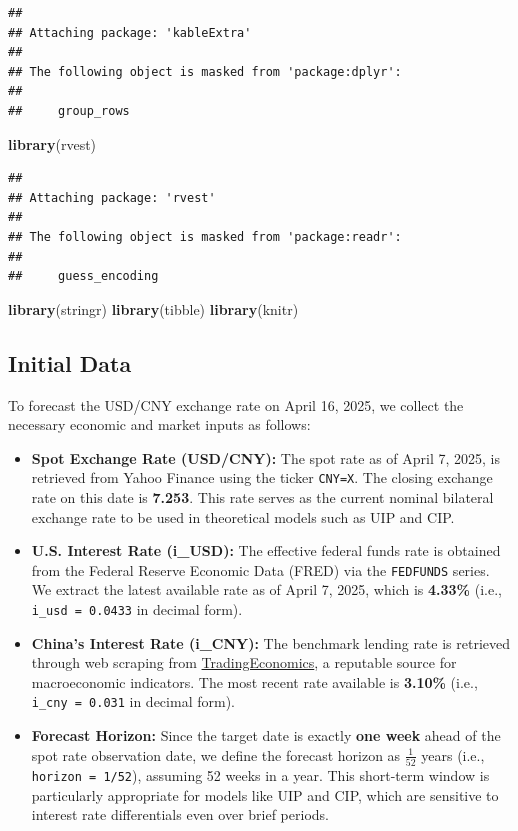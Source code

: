 \documentclass[
]{article}
\newenvironment{Shaded}{\begin{snugshade}}{\end{snugshade}}
\newcommand{\FunctionTok}[1]{\textcolor[rgb]{0.13,0.29,0.53}{\textbf{#1}}}
\newcommand{\NormalTok}[1]{#1}
\begin{document}
\begin{verbatim}
## 
## Attaching package: 'kableExtra'
## 
## The following object is masked from 'package:dplyr':
## 
##     group_rows
\end{verbatim}

\begin{Shaded}
\begin{Highlighting}[]
\FunctionTok{library}\NormalTok{(rvest)}
\end{Highlighting}
\end{Shaded}

\begin{verbatim}
## 
## Attaching package: 'rvest'
## 
## The following object is masked from 'package:readr':
## 
##     guess_encoding
\end{verbatim}

\begin{Shaded}
\begin{Highlighting}[]
\FunctionTok{library}\NormalTok{(stringr)}
\FunctionTok{library}\NormalTok{(tibble)}
\FunctionTok{library}\NormalTok{(knitr)}
\end{Highlighting}
\end{Shaded}

\subsection{Initial Data}\label{initial-data}

To forecast the USD/CNY exchange rate on April 16, 2025, we collect the
necessary economic and market inputs as follows:

\begin{itemize}
\item
  \textbf{Spot Exchange Rate (USD/CNY):} The spot rate as of April 7,
  2025, is retrieved from Yahoo Finance using the ticker \texttt{CNY=X}.
  The closing exchange rate on this date is \textbf{7.253}. This rate
  serves as the current nominal bilateral exchange rate to be used in
  theoretical models such as UIP and CIP.
\item
  \textbf{U.S. Interest Rate (i\_USD):} The effective federal funds rate
  is obtained from the Federal Reserve Economic Data (FRED) via the
  \texttt{FEDFUNDS} series. We extract the latest available rate as of
  April 7, 2025, which is \textbf{4.33\%} (i.e.,
  \texttt{i\_usd\ =\ 0.0433} in decimal form).
\item
  \textbf{China's Interest Rate (i\_CNY):} The benchmark lending rate is
  retrieved through web scraping from
  \href{https://tradingeconomics.com/china/interest-rate}{TradingEconomics},
  a reputable source for macroeconomic indicators. The most recent rate
  available is \textbf{3.10\%} (i.e., \texttt{i\_cny\ =\ 0.031} in
  decimal form).
\item
  \textbf{Forecast Horizon:} Since the target date is exactly
  \textbf{one week} ahead of the spot rate observation date, we define
  the forecast horizon as \(\frac{1}{52}\) years (i.e.,
  \texttt{horizon\ =\ 1/52}), assuming 52 weeks in a year. This
  short-term window is particularly appropriate for models like UIP and
  CIP, which are sensitive to interest rate differentials even over
  brief periods.
\end{itemize}
\end{document}
